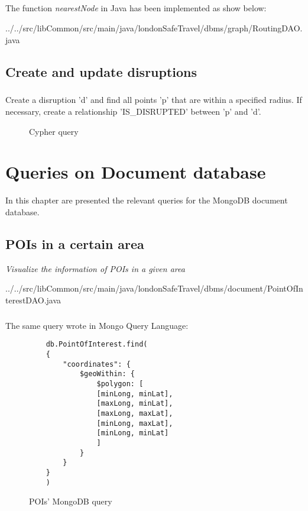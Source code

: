 \paragraph{}
The function \textit{nearestNode} in Java has been implemented as show below:

{../../src/libCommon/src/main/java/londonSafeTravel/dbms/graph/RoutingDAO.java}

\section{Create and update disruptions}
\paragraph{}
Create a disruption 'd' and find all points 'p' that are within a specified radius. If necessary, create a relationship 'IS\_DISRUPTED' between 'p' and 'd'.
\begin{figure}[H]
	
	\caption{Cypher query}
\end{figure}

\chapter{Queries on Document database}
In this chapter are presented the relevant queries for the
MongoDB document database.

\section{POIs in a certain area}
\textit{Visualize the information of POIs in a given area}


{../../src/libCommon/src/main/java/londonSafeTravel/dbms/document/PointOfInterestDAO.java}

\paragraph{}
The same query wrote in Mongo Query Language:
\begin{figure}[H]
\begin{lstlisting}
	db.PointOfInterest.find(
	{
		"coordinates": {
			$geoWithin: {
				$polygon: [
				[minLong, minLat],
				[maxLong, minLat],
				[maxLong, maxLat],
				[minLong, maxLat],
				[minLong, minLat]
				]
			}
		}
	}
	)
\end{lstlisting}
\caption{POIs' MongoDB query}
\end{figure}

